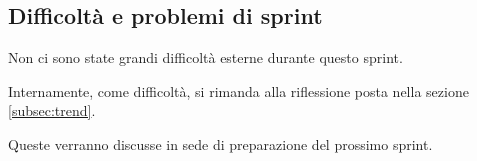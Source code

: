 \subsection{Difficoltà e problemi di sprint}

Non ci sono state grandi difficoltà esterne durante questo sprint.

Internamente, come difficoltà, si rimanda alla riflessione posta nella sezione \ref{subsec:trend}.

Queste verranno discusse in sede di preparazione del prossimo sprint.